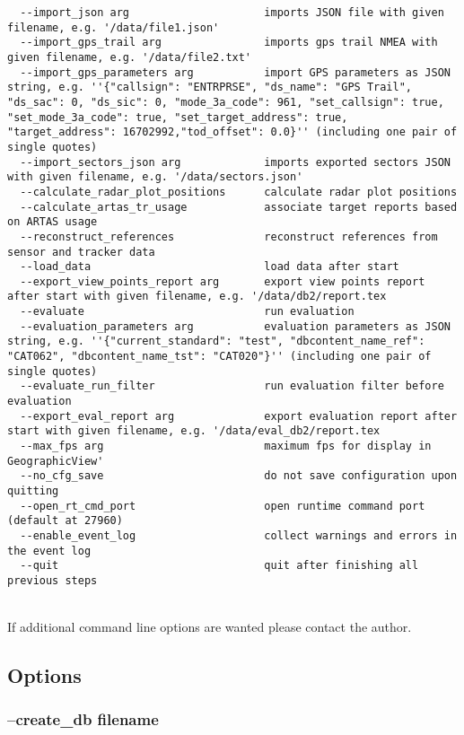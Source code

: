 \begin{lstlisting}
  --import_json arg                     imports JSON file with given filename, e.g. '/data/file1.json'
  --import_gps_trail arg                imports gps trail NMEA with given filename, e.g. '/data/file2.txt'
  --import_gps_parameters arg           import GPS parameters as JSON string, e.g. ''{"callsign": "ENTRPRSE", "ds_name": "GPS Trail", "ds_sac": 0, "ds_sic": 0, "mode_3a_code": 961, "set_callsign": true, "set_mode_3a_code": true, "set_target_address": true, "target_address": 16702992,"tod_offset": 0.0}'' (including one pair of single quotes)
  --import_sectors_json arg             imports exported sectors JSON with given filename, e.g. '/data/sectors.json'
  --calculate_radar_plot_positions      calculate radar plot positions
  --calculate_artas_tr_usage            associate target reports based on ARTAS usage
  --reconstruct_references              reconstruct references from sensor and tracker data
  --load_data                           load data after start
  --export_view_points_report arg       export view points report after start with given filename, e.g. '/data/db2/report.tex
  --evaluate                            run evaluation
  --evaluation_parameters arg           evaluation parameters as JSON string, e.g. ''{"current_standard": "test", "dbcontent_name_ref": "CAT062", "dbcontent_name_tst": "CAT020"}'' (including one pair of single quotes)
  --evaluate_run_filter                 run evaluation filter before evaluation
  --export_eval_report arg              export evaluation report after start with given filename, e.g. '/data/eval_db2/report.tex
  --max_fps arg                         maximum fps for display in GeographicView'
  --no_cfg_save                         do not save configuration upon quitting
  --open_rt_cmd_port                    open runtime command port (default at 27960)
  --enable_event_log                    collect warnings and errors in the event log
  --quit                                quit after finishing all previous steps
\end{lstlisting}
\ \\

If additional command line options are wanted please contact the author.

\subsection{Options}

\subsubsection{--create\_db filename}

